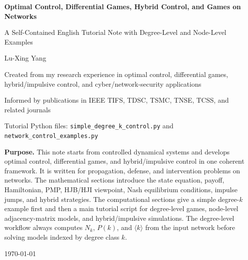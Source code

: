 \documentclass[11pt,a4paper]{article}
\begin{document}
\begin{titlepage}
\centering
\vspace*{1.5cm}
{\sffamily\bfseries\Huge\color{TutorialBlue} Optimal Control, Differential Games, Hybrid Control, and Games on Networks\par}
\vspace{0.5cm}
{\sffamily\Large A Self-Contained English Tutorial Note with Degree-Level and Node-Level Examples\par}
\vspace{0.8cm}
{\large Lu-Xing Yang\par}
\vspace{0.8cm}
{\large Created from my research experience in optimal control, differential games, hybrid/impulsive control, and cyber/network-security applications\par}
\vspace{0.35cm}
{\large Informed by publications in IEEE TIFS, TDSC, TSMC, TNSE, TCSS, and related journals\par}
\vspace{0.35cm}
{\large Tutorial Python files: \texttt{simple\_degree\_k\_control.py} and \texttt{network\_control\_examples.py}\par}
\vfill
\begin{tcolorbox}[width=0.86\textwidth,colback=SoftBlue,colframe=TutorialBlue]
\textbf{Purpose.} This note starts from controlled dynamical systems and develops optimal control, differential games, and hybrid/impulsive control in one coherent framework. It is written for propagation, defense, and intervention problems on networks. The mathematical sections introduce the state equation, payoff, Hamiltonian, PMP, HJB/HJI viewpoint, Nash equilibrium conditions, impulse jumps, and hybrid strategies. The computational sections give a simple degree-$k$ example first and then a main tutorial script for degree-level games, node-level adjacency-matrix models, and hybrid/impulsive simulations. The degree-level workflow always computes $N_k$, $P(k)$, and $\langle k\rangle$ from the input network before solving models indexed by degree class $k$.
\end{tcolorbox}
\vfill
{\large \today\par}
\end{titlepage}

\tableofcontents
\newpage
\end{document}
